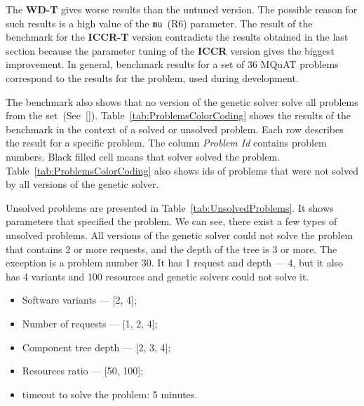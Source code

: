 The \textbf{WD-T} gives worse results than the untuned version. The possible reason for such results is a high value of the \texttt{mu}~(R6) parameter. The result of the benchmark for the \textbf{ICCR-T} version contradicts the results obtained in the last section because the parameter tuning of the \textbf{ICCR} version gives the biggest improvement. In general, benchmark results for a set of 36 MQuAT problems correspond to the results for the problem, used during development.

The benchmark also shows that no version of the genetic solver solve all problems from the set~(See~\ref{}). Table~\ref{tab:ProblemsColorCoding} shows the results of the benchmark in the context of a solved or unsolved problem. Each row describes the result for a specific problem. The column \textit{Problem Id} contains problem numbers. Black filled cell means that solver solved the problem. Table~\ref{tab:ProblemsColorCoding} also shows ids of problems that were not solved by all versions of the genetic solver.

Unsolved problems are presented in Table~\ref{tab:UnsolvedProblems}. It shows parameters that specified the problem. We can see, there exist a few types of unsolved problems. All versions of the genetic solver could not solve the problem that contains 2 or more requests, and the depth of the tree is 3 or more. The exception is a problem number 30. It has 1 request and depth — 4, but it also has 4 variants and 100 resources and genetic solvers could not solve it.

\begin{itemize}
	\item Software variants — [2, 4];
	\item Number of requests — [1, 2, 4];
	\item Component tree depth — [2, 3, 4];
	\item Resources ratio — [50, 100];
	\item timeout to solve the problem: 5 minutes.
\end{itemize}

